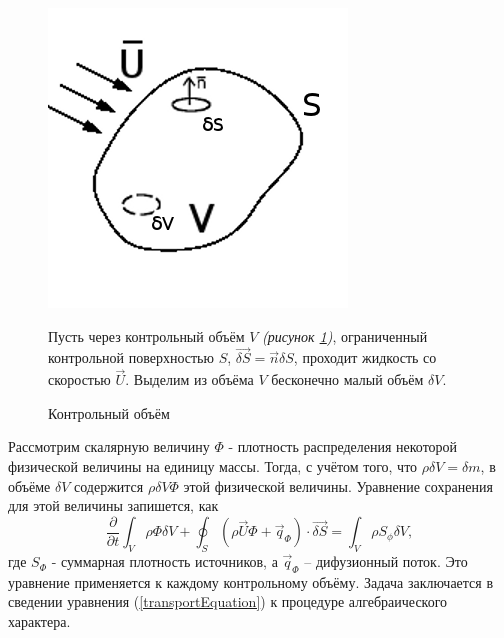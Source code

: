 		\begin{figure}[h]
			\begin{minipage}{0.43\linewidth}
				\includegraphics[scale=0.5]{controlVolume}
				\vspace{-2em}
				\caption{Контрольный объём}
				\label{fig:volume}
			\end{minipage}
			\hspace{-1em}
			\begin{minipage}{0.6\linewidth}
				\vspace{-1em}
				Пусть через контрольный объём $V$ \textit{(рисунок \ref{fig:volume})}, ограниченный контрольной поверхностью $S$, $\vec{\delta S} = \vec{n} \delta S$, проходит жидкость со скоростью $\vec{U}$. Выделим из объёма $V$ бесконечно малый объём $\delta V$. 
			\end{minipage}
		\end{figure}
		\vspace{-1em}
		Рассмотрим скалярную величину $\Phi$ - плотность распределения некоторой физической величины на единицу массы. Тогда, с учётом того, что $\rho \delta V = \delta m$, в объёме $\delta V$ содержится $\rho \delta V \Phi$ этой физической величины. Уравнение сохранения для этой величины запишется, как
		\begin{equation}
			\frac{\partial}{\partial t} \int_V \rho \Phi \delta V + \oint_S \left( \rho \vec{U} \Phi + \vec{q}_{\Phi}  \right)\cdot \vec{\delta S} = \int_V \rho S_{\phi} \delta V,
			\label{transportEquation}
		\end{equation}
		где $S_{\Phi}$ - суммарная плотность источников, а $\vec{q}_{\Phi}$ -- дифузионный поток. Это уравнение применяется к каждому контрольному объёму. Задача заключается в сведении уравнения (\ref{transportEquation}) к процедуре алгебраического характера.
		
